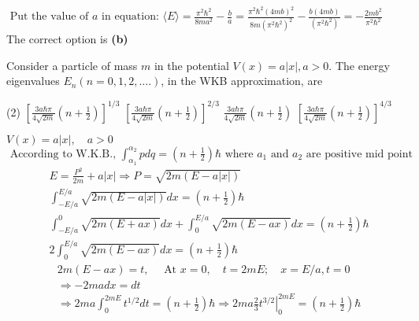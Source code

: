 \begin{enumerate}
\begin{answer}
$$\begin{aligned}
	\end{aligned}$$
	$\text { Put the value of } a \text { in equation: }\langle E\rangle=\frac{\pi^{2} \hbar^{2}}{8 m a^{2}}-\frac{b}{a}=\frac{\pi^{2} \hbar^{2}(4 m b)^{2}}{8 m\left(\pi^{2} \hbar^{2}\right)^{2}}-\frac{b(4 m b)}{\left(\pi^{2} \hbar^{2}\right)}=-\frac{2 m b^{2}}{\pi^{2} \hbar^{2}}$\\
	The correct option is \textbf{(b)}	
\end{answer}
\begin{minipage}{\textwidth}
	\item Consider a particle of mass $m$ in the potential $V(x)=a|x|, a>0$. The energy eigenvalues $E_{n}(n=0,1,2, \ldots .)$, in the WKB approximation, are
\end{minipage}
\begin{tasks}(2)
	\task[\textbf{A.}] $\left[\frac{3 a \hbar \pi}{4 \sqrt{2 m}}\left(n+\frac{1}{2}\right)\right]^{1 / 3}$
	\task[\textbf{B.}]$\left[\frac{3 a \hbar \pi}{4 \sqrt{2 m}}\left(n+\frac{1}{2}\right)\right]^{2 / 3}$
	\task[\textbf{C.}]$\frac{3 a \hbar \pi}{4 \sqrt{2 m}}\left(n+\frac{1}{2}\right)$
	\task[\textbf{D.}]$\left[\frac{3 a \hbar \pi}{4 \sqrt{2 m}}\left(n+\frac{1}{2}\right)\right]^{4 / 3}$
\end{tasks}
\begin{answer}
	$V(x)=a|x|, \quad a>0$\\
	$\text { According to W.K.B., } \int_{\alpha_{1}}^{\alpha_{2}} p d q=\left(n+\frac{1}{2}\right) \hbar \text { where } a_{1} \text { and } a_{2} \text { are positive mid point }$\\
	$$\begin{aligned}
	&E=\frac{P^{2}}{2 m}+a|x| \Rightarrow P=\sqrt{2 m(E-a|x|)} \\
	&\int_{-E / a}^{E / a} \sqrt{2 m(E-a|x|)} d x=\left(n+\frac{1}{2}\right) \hbar \\
	&\int_{-E / a}^{0} \sqrt{2 m(E+a x)} d x+\int_{0}^{E / a} \sqrt{2 m(E-a x)} d x=\left(n+\frac{1}{2}\right) \hbar \\
	&2 \int_{0}^{E / a} \sqrt{2 m(E-a x)} d x=\left(n+\frac{1}{2}\right) \hbar
	\end{aligned}$$
	$$\begin{aligned}
	&2 m(E-a x)=t, \quad \text { At } x=0, \quad t=2 m E ; \quad x=E / a, t=0 \\
	&\Rightarrow-2 m a d x=d t \\
	&\Rightarrow 2 m a \int_{0}^{2 m E} t^{1 / 2} d t=\left.\left(n+\frac{1}{2}\right) \hbar \Rightarrow 2 m a \frac{2}{3} t^{3 / 2}\right|_{0} ^{2 m E}=\left(n+\frac{1}{2}\right) \hbar \\

\end{aligned}$$
\end{answer}
\end{enumerate}
